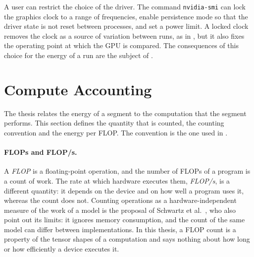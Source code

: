 A user can restrict the choice of the driver.
The command \texttt{nvidia-smi} can lock the graphics clock to a range of frequencies, enable persistence mode so that the driver state is not reset between processes, and set a power limit.
A locked clock removes the clock as a source of variation between runs, as in , but it also fixes the operating point at which the GPU is compared.
The consequences of this choice for the energy of a run are the subject of .


\section{Compute Accounting}\label{sec:compute-accounting}

The thesis relates the energy of a segment to the computation that the segment performs.
This section defines the quantity that is counted, the counting convention and the energy per FLOP.
The convention is the one used in .

\paragraph{FLOPs and FLOP/s.} A \emph{FLOP} is a floating-point operation, and the number of FLOPs of a program is a count of work.
The rate at which hardware executes them, \emph{FLOP/s}, is a different quantity: it depends on the device and on how well a program uses it, whereas the count does not.
Counting operations as a hardware-independent measure of the work of a model is the proposal of Schwartz et al.~\cite{schwartz2020green}, who also point out its limits: it ignores memory consumption, and the count of the same model can differ between implementations.
In this thesis, a FLOP count is a property of the tensor shapes of a computation and says nothing about how long or how efficiently a device executes it.

